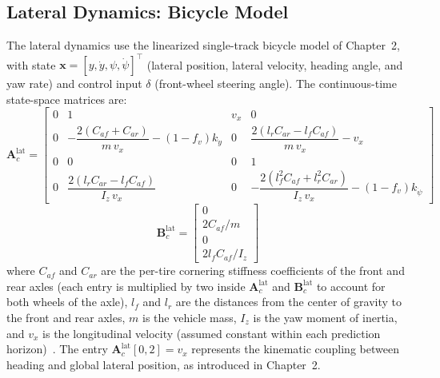 \documentclass[12pt,a4paper,oneside]{report}
\begin{document}
\subsection{Lateral Dynamics: Bicycle Model}
\label{sec:lateral_dynamics}

The lateral dynamics use the linearized single-track bicycle model of Chapter~2, with state $\mathbf{x} = [y, \dot{y}, \psi, \dot{\psi}]^{\top}$ (lateral position, lateral velocity, heading angle, and yaw rate) and control input $\delta$ (front-wheel steering angle). The continuous-time state-space matrices are:
\begin{equation}
\mathbf{A}_c^{\text{lat}} = \begin{bmatrix}
0 & 1 & v_x & 0 \\[4pt]
0 & -\dfrac{2(C_{af} + C_{ar})}{m \, v_x} - (1 - f_v) k_{\dot{y}} & 0 & \dfrac{2(l_r C_{ar} - l_f C_{af})}{m \, v_x} - v_x \\[4pt]
0 & 0 & 0 & 1 \\[4pt]
0 & \dfrac{2(l_r C_{ar} - l_f C_{af})}{I_z \, v_x} & 0 & -\dfrac{2(l_f^2 C_{af} + l_r^2 C_{ar})}{I_z \, v_x} - (1 - f_v) k_{\dot{\psi}}
\end{bmatrix}
\label{eq:Ac_bicycle}
\end{equation}
\begin{equation}
\mathbf{B}_c^{\text{lat}} = \begin{bmatrix} 0 \\ 2 C_{af} / m \\ 0 \\ 2 l_f C_{af} / I_z \end{bmatrix}
\label{eq:Bc_bicycle}
\end{equation}
where $C_{af}$ and $C_{ar}$ are the per-tire cornering stiffness coefficients of the front and rear axles (each entry is multiplied by two inside $\mathbf{A}_c^{\text{lat}}$ and $\mathbf{B}_c^{\text{lat}}$ to account for both wheels of the axle), $l_f$ and $l_r$ are the distances from the center of gravity to the front and rear axles, $m$ is the vehicle mass, $I_z$ is the yaw moment of inertia, and $v_x$ is the longitudinal velocity (assumed constant within each prediction horizon)~\cite{rajamaniVehicleDynamicsControl2005, fernandezVehicleDynamicsModel}. The entry $\mathbf{A}_c^{\text{lat}}[0,2] = v_x$ represents the kinematic coupling between heading and global lateral position, as introduced in Chapter~2.
\end{document}
